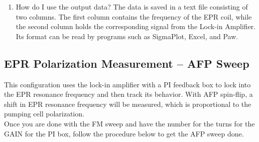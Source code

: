 {\begin{enumerate}
\item How do I use the output data? The data is saved in a text
file consisting of two columns.  The first column contains the frequency
of the EPR coil, while the second column holds the corresponding signal from the
Lock-in Amplifier.  Its format can be read by programs such as SigmaPlot, Excel, and Paw.

\end{enumerate}

\subsection{EPR Polarization Measurement -- AFP Sweep}
\label{sec:eprafp}
This configuration uses the lock-in amplifier with a PI feedback 
box to lock into the EPR resonance frequency and then track its
behavior. With AFP spin-flip, a shift in EPR resonance frequency 
will be measured, which is proportional to the pumping cell polarization.\\

Once you are done with the FM sweep and have the number for the turns for 
the GAIN for the PI box, follow the procedure below to get the AFP sweep done.


\begin{enumerate}


\end{enumerate}}

